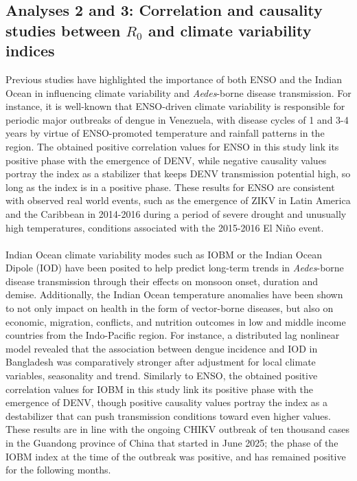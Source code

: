 \documentclass[10pt,twocolumn]{wlscirep}
\begin{document}
\subsection{Analyses 2 and 3: Correlation and causality studies between $R_0$ and climate variability indices} \label{sec-discussion-analysis-2-3}

Previous studies have highlighted the importance of both ENSO and the Indian Ocean in influencing climate variability and \textit{Aedes}-borne disease transmission. For instance, it is well-known that ENSO-driven climate variability is responsible for periodic major outbreaks of dengue in Venezuela, with disease cycles of 1 and 3-4 years by virtue of ENSO-promoted temperature and rainfall patterns in the region\cite{vicenti-gonzalez_2018}. The obtained positive correlation values for ENSO in this study link its positive phase with the emergence of DENV, while negative causality values portray the index as a stabilizer that keeps DENV transmission potential high, so long as the index is in a positive phase. These results for ENSO are consistent with observed real world events, such as the emergence of ZIKV in Latin America and the Caribbean in 2014-2016 during a period of severe drought and unusually high temperatures, conditions associated with the 2015-2016 El Niño event\cite{santos_2023}.
\\
\\
Indian Ocean climate variability modes such as IOBM or the Indian Ocean Dipole (IOD) have been posited to help predict long-term trends in \textit{Aedes}-borne disease transmission through their effects on monsoon onset, duration and demise\cite{chen_2024}. Additionally, the Indian Ocean temperature anomalies have been shown to not only impact on health in the form of vector-borne diseases, but also on economic, migration, conflicts, and nutrition outcomes in low and middle income countries from the Indo-Pacific region\cite{floridi_2025}. For instance, a distributed lag nonlinear model revealed that the association between dengue incidence and IOD in Bangladesh was comparatively stronger after adjustment for local climate variables, seasonality and trend\cite{banu_2015}. Similarly to ENSO, the obtained positive correlation values for IOBM in this study link its positive phase with the emergence of DENV, though positive causality values portray the index as a destabilizer that can push transmission conditions toward even higher values. These results are in line with the ongoing CHIKV outbreak of ten thousand cases in the Guandong province of China that started in June 2025; the phase of the IOBM index at the time of the outbreak was positive, and has remained positive for the following months.
\end{document}
